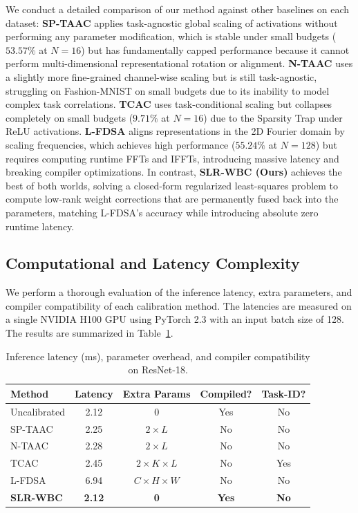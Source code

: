 \documentclass{article}
\theoremstyle{plain}
\theoremstyle{definition}
\theoremstyle{remark}
\begin{document}
We conduct a detailed comparison of our method against other baselines on each dataset: \textbf{SP-TAAC} \cite{taac2023} applies task-agnostic global scaling of activations without performing any parameter modification, which is stable under small budgets ($53.57\%$ at $N=16$) but has fundamentally capped performance because it cannot perform multi-dimensional representational rotation or alignment. \textbf{N-TAAC} uses a slightly more fine-grained channel-wise scaling but is still task-agnostic, struggling on Fashion-MNIST on small budgets due to its inability to model complex task correlations. \textbf{TCAC} \cite{tcac2024} uses task-conditional scaling but collapses completely on small budgets ($9.71\%$ at $N=16$) due to the Sparsity Trap under ReLU activations. \textbf{L-FDSA} \cite{fdsa2025} aligns representations in the 2D Fourier domain by scaling frequencies, which achieves high performance ($55.24\%$ at $N=128$) but requires computing runtime FFTs and IFFTs, introducing massive latency and breaking compiler optimizations. In contrast, \textbf{SLR-WBC (Ours)} achieves the best of both worlds, solving a closed-form regularized least-squares problem to compute low-rank weight corrections that are permanently fused back into the parameters, matching L-FDSA's accuracy while introducing absolute zero runtime latency.

\subsection{Computational and Latency Complexity}
We perform a thorough evaluation of the inference latency, extra parameters, and compiler compatibility of each calibration method. The latencies are measured on a single NVIDIA H100 GPU using PyTorch 2.3 with an input batch size of 128. The results are summarized in Table~\ref{tab:latency}.

\begin{table}[h]
\caption{Inference latency (ms), parameter overhead, and compiler compatibility on ResNet-18.}
\label{tab:latency}
\vskip 0.15in
\begin{center}
\begin{scriptsize}
\begin{sc}
\setlength{\tabcolsep}{1.5pt}
\begin{tabular}{lcccc}
\toprule
Method & Latency & Extra Params & Compiled? & Task-ID? \\
\midrule
Uncalibrated & 2.12 & 0 & Yes & No \\
SP-TAAC & 2.25 & $2 \times L$ & No & No \\
N-TAAC & 2.28 & $2 \times L$ & No & No \\
TCAC & 2.45 & $2 \times K \times L$ & No & Yes \\
L-FDSA & 6.94 & $C \times H \times W$ & No & No \\
\textbf{SLR-WBC} & \textbf{2.12} & \textbf{0} & \textbf{Yes} & \textbf{No} \\
\bottomrule
\end{tabular}
\end{sc}
\end{scriptsize}
\end{center}
\vskip -0.1in
\end{table}
\end{document}
